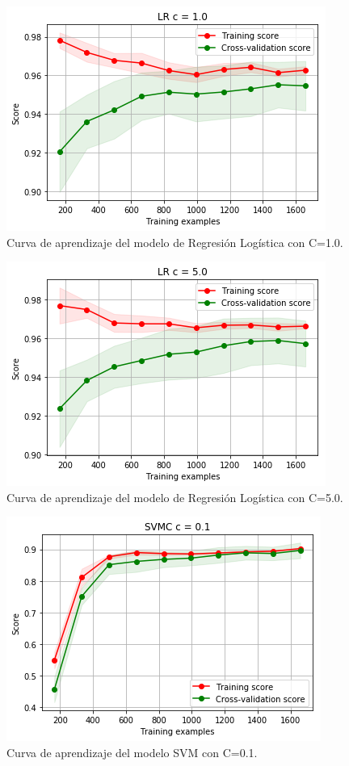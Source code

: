 \documentclass[11pt,a4paper]{article}
\begin{document}
\begin{figure}[H]
    \centering
    \includegraphics[scale=0.7]{img/lc-lr-c-1.png}
    \caption{Curva de aprendizaje del modelo de Regresión Logística con C=1.0.}
    \label{fig:lc-lr-c-1}
\end{figure}

\begin{figure}[H]
    \centering
    \includegraphics[scale=0.7]{img/lc-lr-c-5.png}
    \caption{Curva de aprendizaje del modelo de Regresión Logística con C=5.0.}
    \label{fig:lc-lr-c-5}
\end{figure}

\begin{figure}[H]
    \centering
    \includegraphics[scale=0.7]{img/lc-svm-c-01.png}
    \caption{Curva de aprendizaje del modelo SVM con C=0.1.}
    \label{fig:lc-svm-c-01}
\end{figure}
\end{document}
